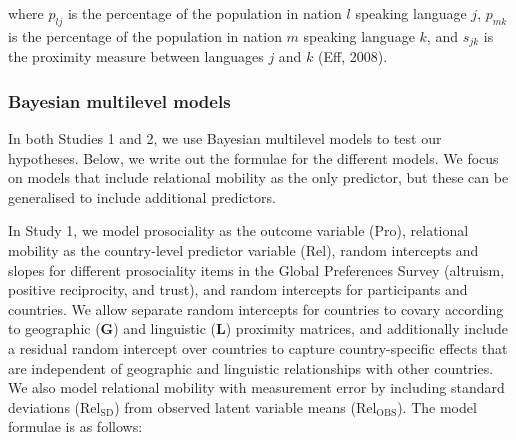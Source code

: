 \documentclass[
  man,floatsintext]{apa6}
\begin{document}
where \(p_{lj}\) is the percentage of the population in nation \(l\) speaking language \(j\), \(p_{mk}\) is the percentage of the population in nation \(m\) speaking language \(k\), and \(s_{jk}\) is the proximity measure between languages \(j\) and \(k\) (Eff, 2008).

\hypertarget{bayesian-multilevel-models}{%
\subsubsection{Bayesian multilevel models}\label{bayesian-multilevel-models}}

In both Studies 1 and 2, we use Bayesian multilevel models to test our hypotheses. Below, we write out the formulae for the different models. We focus on models that include relational mobility as the only predictor, but these can be generalised to include additional predictors.

In Study 1, we model prosociality as the outcome variable (\(\text{Pro}\)), relational mobility as the country-level predictor variable (\(\text{Rel}\)), random intercepts and slopes for different prosociality items in the Global Preferences Survey (altruism, positive reciprocity, and trust), and random intercepts for participants and countries. We allow separate random intercepts for countries to covary according to geographic (\(\textbf{G}\)) and linguistic (\(\textbf{L}\)) proximity matrices, and additionally include a residual random intercept over countries to capture country-specific effects that are independent of geographic and linguistic relationships with other countries. We also model relational mobility with measurement error by including standard deviations (\(\text{Rel}_{\text{SD}}\)) from observed latent variable means (\(\text{Rel}_{\text{OBS}}\)). The model formulae is as follows:
\end{document}
